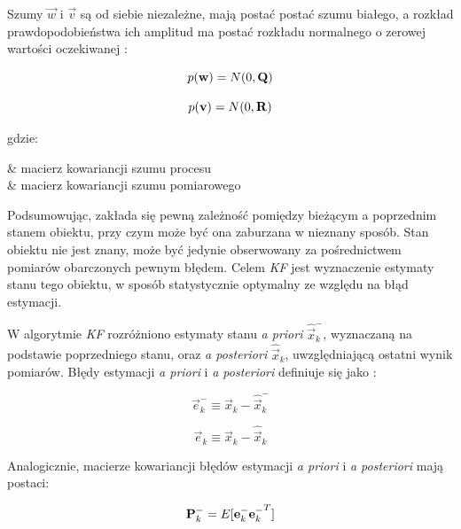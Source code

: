 Szumy $\vec{w}$ i $\vec{v}$ są od siebie niezależne, mają postać postać szumu białego, a rozkład prawdopodobieństwa ich amplitud ma postać rozkładu normalnego o zerowej wartości oczekiwanej \cite{Welch1995}:

\begin{equation}
\label{equ:Filtr_Kalmana_szum_procesu}
	p(\mathbf{w}) = N(0, \mathbf{Q})
\end{equation}

\begin{equation}
\label{equ:Filtr_Kalmana_szum_pomiaru}
	p(\mathbf{v}) = N(0, \mathbf{R})
\end{equation}

\noindent
gdzie:

\begin{conditions}
	 & macierz kowariancji szumu procesu \\
	 & macierz kowariancji szumu pomiarowego \\
\end{conditions}

Podsumowując, zakłada się pewną zależność pomiędzy bieżącym a poprzednim stanem obiektu, przy czym może być ona zaburzana w nieznany sposób. Stan obiektu nie jest znany, może być jedynie obserwowany za pośrednictwem pomiarów obarczonych pewnym błędem. Celem \textit{KF} jest wyznaczenie estymaty stanu tego obiektu, w sposób statystycznie optymalny ze względu na błąd estymacji.

W algorytmie \textit{KF} rozróżniono estymaty stanu \textit{a priori} $\hat{\vec{x}}_k^-$, wyznaczaną na podstawie poprzedniego stanu, oraz \textit{a posteriori} $\hat{\vec{x}}_k$, uwzględniającą ostatni wynik pomiarów. Błędy estymacji \textit{a priori} i \textit{a posteriori} definiuje się jako \cite{Welch1995}:

\begin{equation}
\label{equ:Filtr_Kalmana_blad_a_priori}
	\vec{e}_k^- \equiv \vec{x}_k - \hat{\vec{x}}_k^-
\end{equation}

\begin{equation}
\label{equ:Filtr_Kalmana_a_posteriori}
	\vec{e}_k \equiv \vec{x}_k - \hat{\vec{x}}_k
\end{equation}

Analogicznie, macierze kowariancji błędów estymacji \textit{a priori} i \textit{a posteriori} mają postaci:

\begin{equation}
\label{equ:Filtr_Kalmana_macierz_kowariancji_a_priori}
	\mathbf{P}_k^- = E[\mathbf{e}_k^- {\mathbf{e}_k^-}^T]
\end{equation}

